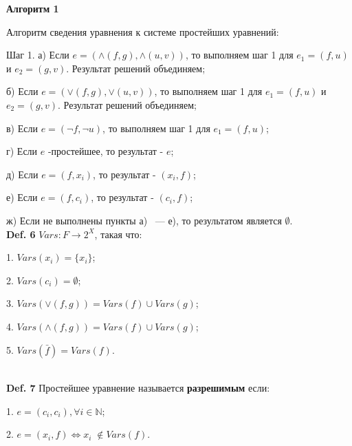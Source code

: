 \documentclass[12pt]{article}
\begin{document}
     \hypertarget{a1}{{\bf Алгоритм 1}}
     Алгоритм сведения уравнения к системе простейших уравнений:
     
     Шаг 1. а) Если $e=(\wedge(f,g),\wedge(u,v))$, то выполняем шаг 1 для $e_{1}=(f,u)$ и $e_{2}=(g,v)$. Результат решений объединяем;
     
     б) Если $e=(\vee(f,g),\vee(u,v))$, то выполняем шаг 1 для $e_{1}=(f,u)$ и $e_{2}=(g,v)$. Результат решений объединяем;
     
     в) Если $e=(\neg f,\neg u)$, то выполняем шаг 1 для $e_{1}=(f,u)$;
     
     г) Если $e$ -простейшее, то результат - $e$;
     
     д) Если $e=(f,x_{i})$, то результат - $(x_{i}, f)$; 
     
     е) Если $e=(f,c_{i})$, то результат - $(c_{i}, f)$; 
     
     ж) Если не выполнены пункты а) ~--- \; е), то результатом является $  \emptyset $.
     \\  
        
     {\bf Def. 6} $Vars:F \rightarrow 2^{X}$, такая что:
     
     1. $Vars(x_{i})= \lbrace x_{i} \rbrace$;
     
     2. $Vars(c_{i})=  \emptyset$;
     
     3. $Vars(\vee(f,g))= Vars(f)\cup Vars(g)$;
     
     4. $Vars(\wedge(f,g))= Vars(f)\cup Vars(g)$;
     
     5. $Vars(\bar f)= Vars(f)$.
     \\
\begin{comment}    
    {\bf Def. 7} $Len: F \longrightarrow \mathbb{N}$ такая что:
    
    1. $Len(x_{i})= 1$;
    
    2. $Len(c_{i})=  1$;
    
    3. $Len(\vee(f,g))= Len(f) + Len(g)$;
    
    4. $Len(\wedge(f,g))= Len(f) + Len(g)$;
    
    5. $Len(\bar f)= Len(f)$.  
\end{comment}   
    \\
     
     {\bf Def. 7} Простейшее уравнение называется {\bf разрешимым} если:
     
     1. $e =(c_{i},c_{i}), \forall i \in \mathbb{N}$;
     
     2. $e =(x_{i},f) \Leftrightarrow x_{i} \;\notin Vars(f)$.
     \\
     
\end{document}
